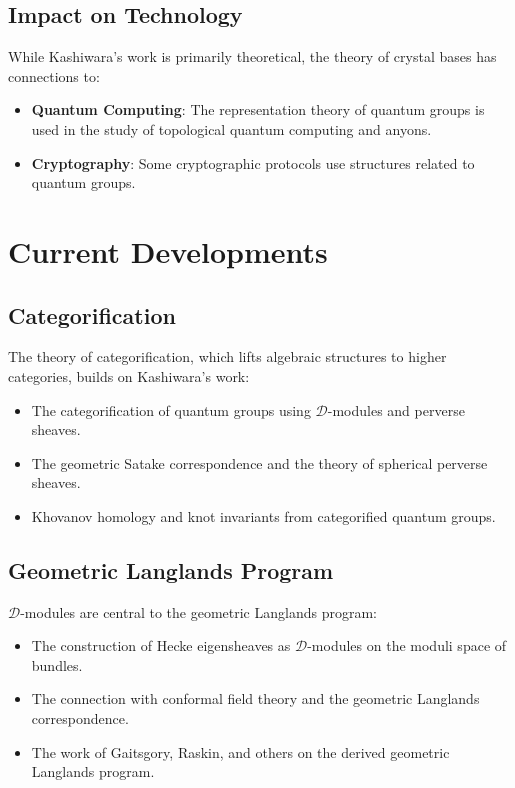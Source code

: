 \subsection{Impact on Technology}

While Kashiwara's work is primarily theoretical, the theory of crystal bases has connections to:
\begin{itemize}
\item \textbf{Quantum Computing}: The representation theory of quantum groups is used in the study of topological quantum computing and anyons.
\item \textbf{Cryptography}: Some cryptographic protocols use structures related to quantum groups.
\end{itemize}

\section{Current Developments}

\subsection{Categorification}

The theory of categorification, which lifts algebraic structures to higher categories, builds on Kashiwara's work:
\begin{itemize}
\item The categorification of quantum groups using $\mathcal{D}$-modules and perverse sheaves.
\item The geometric Satake correspondence and the theory of spherical perverse sheaves.
\item Khovanov homology and knot invariants from categorified quantum groups.
\end{itemize}

\subsection{Geometric Langlands Program}

$\mathcal{D}$-modules are central to the geometric Langlands program:
\begin{itemize}
\item The construction of Hecke eigensheaves as $\mathcal{D}$-modules on the moduli space of bundles.
\item The connection with conformal field theory and the geometric Langlands correspondence.
\item The work of Gaitsgory, Raskin, and others on the derived geometric Langlands program.
\end{itemize}

